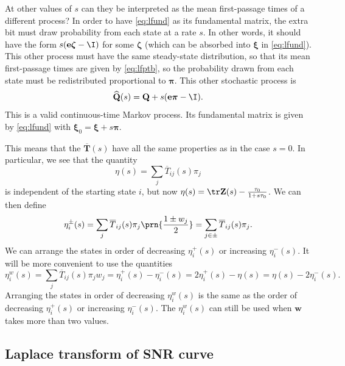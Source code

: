 \documentclass[12pt]{article}
\newcommand{\onev}{\mathbf{e}}
\newcommand{\MMm}{Q}
\newcommand{\MM}{\mathbf{\MMm}}
\newcommand{\eqm}{\pi}
\newcommand{\eq}{\boldsymbol{\eqm}}
\newcommand{\fptm}{T}
\newcommand{\fpt}{\mathbf{\fptm}}
\newcommand{\fptbm}{\overline{\fptm}}
\newcommand{\fptb}{\overline{\fpt}}
\newcommand{\fundm}{Z}
\newcommand{\fund}{\mathbf{\fundm}}
\newcommand{\arowm}{\xi}
\newcommand{\arow}{\boldsymbol{\arowm}}
\newcommand{\etwm}{\eta^w}
\newcommand{\wm}{w}
\newcommand{\w}{\mathbf{\wm}}
\newcommand{\shift}[1]{\widehat{#1}}
\begin{document}
At other values of \(s\) can they be interpreted as the mean first-passage times of a different process?
In order to have \cref{eq:lfund} as its fundamental matrix, the extra bit must draw probability from each state at a rate \(s\).
In other words, it should have the form \(s(\onev \boldsymbol{\zeta} - \I)\) for some \(\boldsymbol{\zeta} \) 
(which can be absorbed into \(\arow\) in \cref{eq:lfund}).
This other process must have the same steady-state distribution, so that its mean first-passage times are given by \cref{eq:lfptb}, so the probability drawn from each state must be redistributed proportional to \(\eq\).
This other stochastic process is
%
\begin{equation}\label{eq:lshift}
  \shift{\MM}(s) = \MM + s (\onev \eq - \I).
\end{equation}
%
This is a valid continuous-time Markov process.
Its fundamental matrix is given by \cref{eq:lfund} with \( \arow_0 = \arow + s \eq \).

This means that the \( \fptb(s) \) have all the same properties as in the case \(s=0\).
In particular, we see that the quantity
%
\begin{equation}\label{eq:lkemeny}
  \eta(s) = \sum_j \fptbm_{ij}(s) \eqm_j
\end{equation}
%
is independent of the starting state \(i\), but now \(\eta(s) = \tr\fund(s) - \frac{\tau_0}{1 + s \tau_0}\).
We can then define
%
\begin{equation}\label{eq:lpmixtime}
  \eta^{\pm}_i(s) = \sum_j \fptbm_{ij}(s) \eqm_j \prn{\frac{1 \pm \wm_j}{2}} 
      =  \sum_{j\in \pm} \fptbm_{ij}(s) \eqm_j.
\end{equation}
%
We can arrange the states in order of decreasing \(\eta^{+}_i(s)\) or increasing \(\eta^{-}_i(s)\).
It will be more convenient to use the quantities
%
\begin{equation}\label{eq:lwpmixtime}
  \etwm_i(s) = \sum_j \fptbm_{ij}(s)\eqm_j \wm_j
    = \eta^+_i(s) - \eta^-_i(s) 
    = 2\eta^+_i(s) - \eta(s) 
    = \eta(s) - 2\eta^-_i(s) .
\end{equation}
%
Arranging the states in order of decreasing \(\etwm_i(s)\) is the same as the order of decreasing \(\eta^{+}_i(s)\) or increasing \(\eta^{-}_i(s)\).
The \(\etwm_i(s)\) can still be used when \(\w\) takes more than two values.


\subsection{Laplace transform of SNR curve}\label{sec:laplaceSNR}
\end{document}
